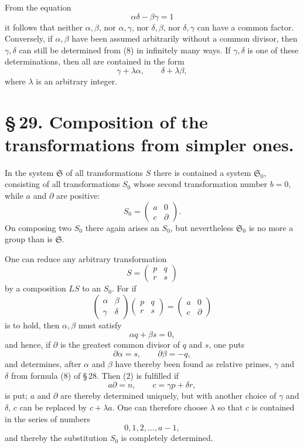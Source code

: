 \documentclass[11pt]{article}
\begin{document}
From the equation
\begin{equation}
\alpha\delta-\beta\gamma=1 \tag{8}
\end{equation}
it follows that neither $\alpha,\beta$, nor $\alpha,\gamma$, nor $\delta,\beta$, nor $\delta,\gamma$ can have a common factor. Conversely, if $\alpha,\beta$ have been assumed arbitrarily without a common divisor, then $\gamma,\delta$ can still be determined from (8) in infinitely many ways. If $\gamma,\delta$ is one of these determinations, then all are contained in the form
\begin{equation}
\gamma+\lambda\alpha,\qquad \delta+\lambda\beta, \tag{9}
\end{equation}
where $\lambda$ is an arbitrary integer.

\section*{\S\,29. Composition of the transformations from simpler ones.}

In the system $\mathfrak S$ of all transformations $S$ there is contained a system $\mathfrak S_0$, consisting of all transformations $S_0$ whose second transformation number $b=0$, while $a$ and $\partial$ are positive:
\begin{equation}
S_0=\begin{pmatrix}a&0\\ c&\partial\end{pmatrix}. \tag{1}
\end{equation}
On composing two $S_0$ there again arises an $S_0$, but nevertheless $\mathfrak S_0$ is no more a group than is $\mathfrak S$.

One can reduce any arbitrary transformation
\[
S=\begin{pmatrix}p&q\\ r&s\end{pmatrix}
\]
by a composition $LS$ to an $S_0$. For if
\begin{equation}
\begin{pmatrix}\alpha&\beta\\ \gamma&\delta\end{pmatrix}
\begin{pmatrix}p&q\\ r&s\end{pmatrix}
=\begin{pmatrix}a&0\\ c&\partial\end{pmatrix} \tag{2}
\end{equation}
is to hold, then $\alpha,\beta$ must satisfy
\[
\alpha q+\beta s=0,
\]
and hence, if $\partial$ is the greatest common divisor of $q$ and $s$, one puts
\[
\partial\alpha=s,
\qquad
\partial\beta=-q,
\]
and determines, after $\alpha$ and $\beta$ have thereby been found as relative primes, $\gamma$ and $\delta$ from formula (8) of \S\,28. Then (2) is fulfilled if
\[
a\partial=n,
\qquad
c=\gamma p+\delta r,
\]
is put; $a$ and $\partial$ are thereby determined uniquely, but with another choice of $\gamma$ and $\delta$, $c$ can be replaced by $c+\lambda a$. One can therefore choose $\lambda$ so that $c$ is contained in the series of numbers
\[
0,1,2,\ldots,a-1,
\]
and thereby the substitution $S_0$ is completely determined.
\end{document}
